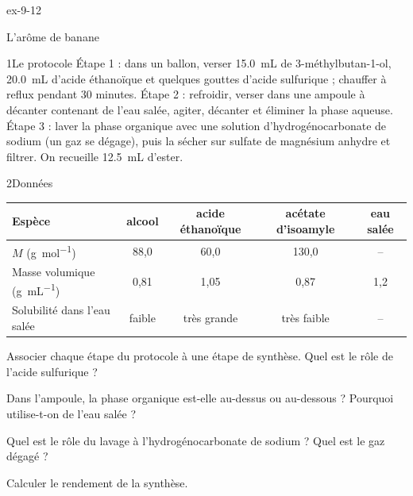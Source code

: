 \begin{blocLivre}{ex-9-12}
\begin{exercice}[3]{L'arôme de banane}
\begin{docu}{1}{Le protocole}
Étape 1 : dans un ballon, verser \qty{15,0}{mL} de 3-méthylbutan-1-ol, \qty{20,0}{mL} d'acide éthanoïque et quelques gouttes d'acide
sulfurique ; chauffer à reflux pendant 30 minutes. Étape 2 : refroidir, verser dans une ampoule à décanter contenant de
l'eau salée, agiter, décanter et éliminer la phase aqueuse. Étape 3 : laver la phase organique avec une solution
d'hydrogénocarbonate de sodium (un gaz se dégage), puis la sécher sur sulfate de magnésium anhydre et filtrer. On
recueille \qty{12,5}{mL} d'ester.
\end{docu}
\begin{docu}{2}{Données}
\par\smallskip\noindent\hfill\begin{tabular}{lcccc}
\toprule
Espèce & alcool & acide éthanoïque & acétate d'isoamyle & eau salée \\
\midrule
$M$ (\unit{g.mol^{-1}}) & 88,0 & 60,0 & 130,0 & -- \\
Masse volumique (\unit{g.mL^{-1}}) & 0,81 & 1,05 & 0,87 & 1,2 \\
Solubilité dans l'eau salée & faible & très grande & très faible & -- \\
\bottomrule
\end{tabular}\hfill\null\par\smallskip
\end{docu}
\begin{questions}
\item Associer chaque étape du protocole à une étape de synthèse. Quel est le rôle de l'acide sulfurique ?
\item Dans l'ampoule, la phase organique est-elle au-dessus ou au-dessous ? Pourquoi utilise-t-on de l'eau salée ?
\item Quel est le rôle du lavage à l'hydrogénocarbonate de sodium ? Quel est le gaz dégagé ?
\item \initiative Calculer le rendement de la synthèse.
\end{questions}
\end{exercice}
\end{blocLivre}

